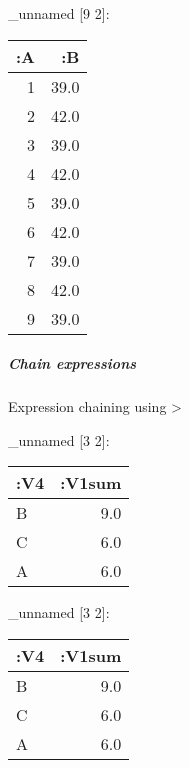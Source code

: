 \documentclass[]{article}
\newenvironment{Shaded}{\begin{snugshade}}{\end{snugshade}}
\newcommand{\KeywordTok}[1]{\textcolor[rgb]{0.13,0.29,0.53}{\textbf{#1}}}
\newcommand{\DecValTok}[1]{\textcolor[rgb]{0.00,0.00,0.81}{#1}}
\newcommand{\VariableTok}[1]{\textcolor[rgb]{0.00,0.00,0.00}{#1}}
\newcommand{\AttributeTok}[1]{\textcolor[rgb]{0.77,0.63,0.00}{#1}}
\newcommand{\NormalTok}[1]{#1}
\let\oldsubparagraph\subparagraph
\renewcommand{\subparagraph}[1]{\oldsubparagraph{#1}\mbox{}}
\begin{document}
\_unnamed {[}9 2{]}:

\begin{longtable}[]{@{}rr@{}}
\toprule
:A & :B\tabularnewline
\midrule
\endhead
1 & 39.0\tabularnewline
2 & 42.0\tabularnewline
3 & 39.0\tabularnewline
4 & 42.0\tabularnewline
5 & 39.0\tabularnewline
6 & 42.0\tabularnewline
7 & 39.0\tabularnewline
8 & 42.0\tabularnewline
9 & 39.0\tabularnewline
\bottomrule
\end{longtable}

\subparagraph{Chain expressions}\label{chain-expressions}

Expression chaining using \textgreater{}

\begin{Shaded}
\end{Shaded}

\_unnamed {[}3 2{]}:

\begin{longtable}[]{@{}lr@{}}
\toprule
:V4 & :V1sum\tabularnewline
\midrule
\endhead
B & 9.0\tabularnewline
C & 6.0\tabularnewline
A & 6.0\tabularnewline
\bottomrule
\end{longtable}

\begin{Shaded}
\end{Shaded}

\_unnamed {[}3 2{]}:

\begin{longtable}[]{@{}lr@{}}
\toprule
:V4 & :V1sum\tabularnewline
\midrule
\endhead
B & 9.0\tabularnewline
C & 6.0\tabularnewline
A & 6.0\tabularnewline
\bottomrule
\end{longtable}
\end{document}
